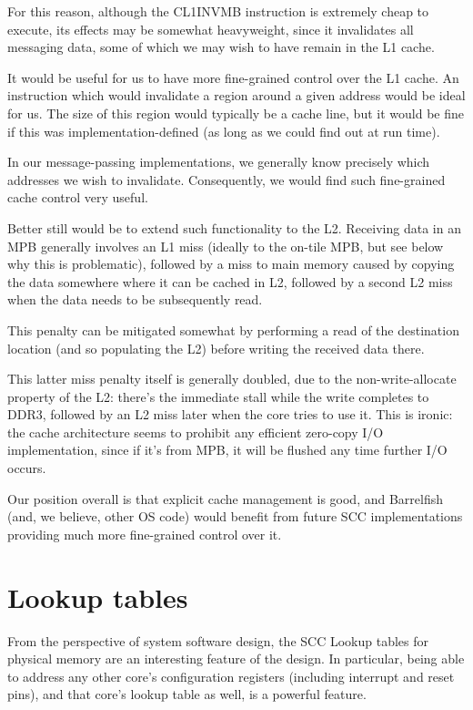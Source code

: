 \documentclass[a4paper,twoside]{report} %
\begin{document}
For this reason, although the CL1INVMB instruction is extremely cheap to
execute, its effects may be somewhat heavyweight, since it invalidates
all messaging data, some of which we may wish to have remain in the L1
cache. 

It would be useful for us to have more fine-grained control over the
L1 cache.  An instruction which would
invalidate a region around a given address would be ideal for us.  
The size of this region would typically be a cache line, but it would
be fine if this was implementation-defined (as long as we could find
out at run time).

In our message-passing implementations, we generally know precisely
which addresses we wish to invalidate.  Consequently, we would find
such fine-grained cache control very useful. 

Better still would be to extend such functionality to the L2.
Receiving data in an MPB generally involves an L1 miss (ideally to
the on-tile MPB, but see below why this is problematic), followed by
a miss to main memory caused by copying the data somewhere where it
can be cached in L2, followed by a second L2 miss when the data needs
to be subsequently read. 

This penalty can be mitigated somewhat by performing a read of the
destination location (and so populating the L2) before writing the
received data there.  

This latter miss penalty itself is generally doubled, due to the
non-write-allocate property of the L2: there's the immediate stall
while the write completes to DDR3, followed by an L2 miss later when
the core tries to use it.  This is ironic: the cache
architecture seems to prohibit any efficient zero-copy I/O
implementation, since if it's from MPB, it will be flushed any time
further I/O occurs. 

Our position overall is that explicit cache management is good, and
Barrelfish (and, we believe, other OS code) would benefit from future
SCC implementations providing much more fine-grained control over it. 

\section{Lookup tables}

From the perspective of system software design, the SCC Lookup tables
for physical memory are an interesting feature of the
design.  In particular, being able to address any other core's
configuration registers (including interrupt and reset pins), and that
core's lookup table as well, is a powerful feature. 
\end{document}
